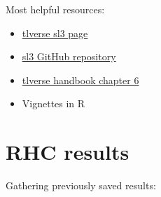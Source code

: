 \documentclass[
]{book}
\providecommand{\tightlist}{%
  \setlength{\itemsep}{0pt}\setlength{\parskip}{0pt}}
\begin{document}
Most helpful resources:

\begin{itemize}
\tightlist
\item
  \href{https://tlverse.org/sl3/}{tlverse sl3 page}
\item
  \href{https://github.com/tlverse/sl3/}{sl3 GitHub repository}
\item
  \href{https://tlverse.org/tlverse-handbook/tmle3.html}{tlverse handbook chapter 6}
\item
  Vignettes in R
\end{itemize}

\hypertarget{rhc-results}{%
\section{RHC results}\label{rhc-results}}

Gathering previously saved results:
\end{document}
